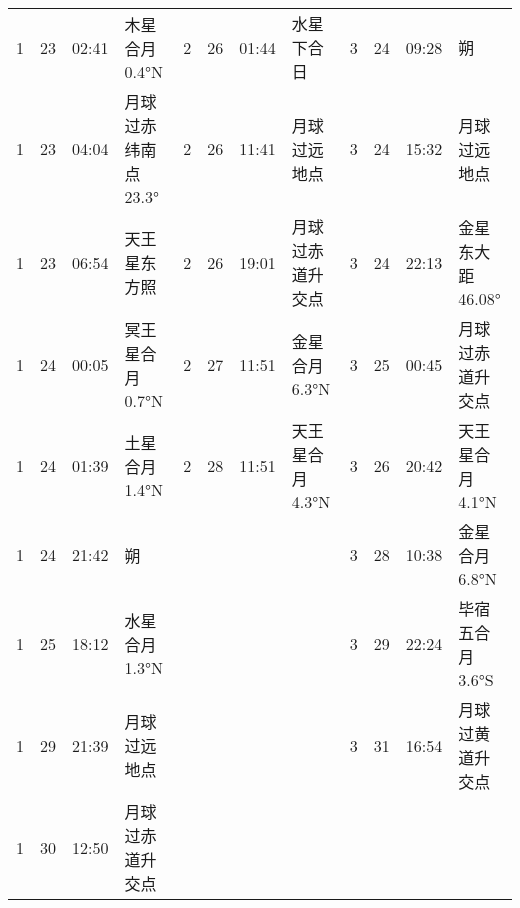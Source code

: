\begin{tabular}{llll|llll|llll}
1 & 23 & 02:41 & 木星合月 0.4°N & 2 & 26 & 01:44 & 水星下合日 & 3 & 24 & 09:28 & 朔 \tabularnewline
1 & 23 & 04:04 & 月球过赤纬南点 23.3° & 2 & 26 & 11:41 & 月球过远地点 & 3 & 24 & 15:32 & 月球过远地点 \tabularnewline
1 & 23 & 06:54 & 天王星东方照 & 2 & 26 & 19:01 & 月球过赤道升交点 & 3 & 24 & 22:13 & 金星东大距 46.08° \tabularnewline
1 & 24 & 00:05 & 冥王星合月 0.7°N & 2 & 27 & 11:51 & 金星合月 6.3°N & 3 & 25 & 00:45 & 月球过赤道升交点 \tabularnewline
1 & 24 & 01:39 & 土星合月 1.4°N & 2 & 28 & 11:51 & 天王星合月 4.3°N & 3 & 26 & 20:42 & 天王星合月 4.1°N \tabularnewline
1 & 24 & 21:42 & 朔 &  &  &  &  & 3 & 28 & 10:38 & 金星合月 6.8°N \tabularnewline
1 & 25 & 18:12 & 水星合月 1.3°N &  &  &  &  & 3 & 29 & 22:24 & 毕宿五合月 3.6°S \tabularnewline
1 & 29 & 21:39 & 月球过远地点 &  &  &  &  & 3 & 31 & 16:54 & 月球过黄道升交点 \tabularnewline
1 & 30 & 12:50 & 月球过赤道升交点 &  &  &  &  &  &  &  &  \tabularnewline
\hline \end{tabular}

